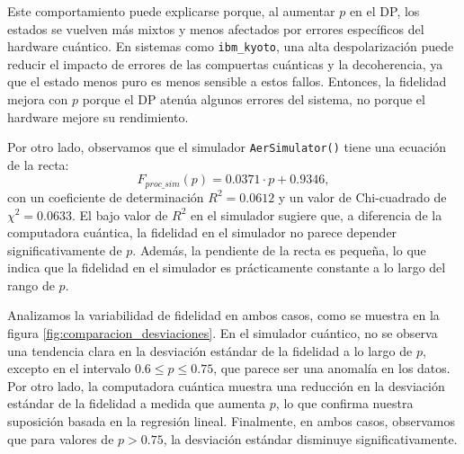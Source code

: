 \documentclass[letterpaper,12pt]{thesisECFM}
\theoremstyle{plain}
\theoremstyle{definition}
\theoremstyle{remark}
\newcommand{\1}{\mathbb{1}}
\begin{document}
Este comportamiento puede explicarse porque, al aumentar $p$ en el DP, los estados se vuelven más mixtos y menos afectados por errores específicos del hardware cuántico. En sistemas como \texttt{ibm\_kyoto}, una alta despolarización puede reducir el impacto de errores de las compuertas cuánticas y la decoherencia, ya que el estado menos puro es menos sensible a estos fallos. Entonces, la fidelidad mejora con  $p$ porque el DP atenúa algunos errores del sistema, no porque el hardware mejore su rendimiento. 


Por otro lado, observamos que el simulador \texttt{AerSimulator()} tiene una ecuación de la recta:
\begin{equation}
    F_{proc\_sim}(p) = 0.0371 \cdot p + 0.9346,
\end{equation}
con un coeficiente de determinación $R^2 = 0.0612$ y un valor de Chi-cuadrado
de $\chi^2 = 0.0633$. El bajo valor de $R^2$ en el simulador sugiere que, a
diferencia de la computadora cuántica, la fidelidad en el simulador no parece
depender significativamente de $p$. Además, la pendiente de la recta es
pequeña, lo que indica que la fidelidad en el simulador es prácticamente
constante a lo largo del rango de $p$.  

Analizamos la variabilidad de fidelidad en ambos casos, como se muestra en la
figura \ref{fig:comparacion_desviaciones}. En el simulador cuántico, no se
observa una tendencia clara en la desviación estándar de la fidelidad a lo
largo de $p$, excepto en el intervalo $0.6 \le p \leq 0.75$, que parece ser una
anomalía en los datos. Por otro lado, la computadora cuántica muestra una
reducción en la desviación estándar de la fidelidad a medida que aumenta $p$,
lo que confirma nuestra suposición basada en la regresión lineal. Finalmente,
en ambos casos, observamos que para valores de $p>0.75$, la desviación estándar
disminuye significativamente. 
\end{document}
